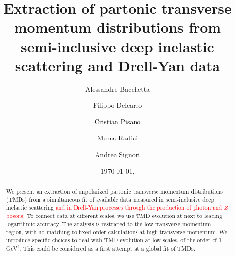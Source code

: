 \documentclass[aps,preprintnumbers,showpacs,nofootinbib,superscriptaddress,floatfix]{revtex4}
\begin{document}
\allowdisplaybreaks[2]


\title{
Extraction of partonic transverse momentum distributions 
from semi-inclusive deep
inelastic scattering and Drell-Yan data
}

\author{Alessandro Bacchetta}

\author{Filippo Delcarro}

\author{Cristian Pisano}

\author{Marco Radici}

\author{Andrea Signori}

\begin{abstract}
We present an extraction of unpolarized partonic transverse momentum distributions (TMDs)
from a simultaneous fit of available data measured in semi-inclusive deep inelastic scattering 
\textcolor{red}{and in Drell-Yan processes through the production of photon and $Z$ bosons}. 
To connect data at different scales, we use TMD evolution at next-to-leading logarithmic accuracy. The
analysis is restricted to the low-transverse-momentum region, with no matching
to fixed-order calculations at high transverse momentum. We introduce specific
choices to deal with TMD evolution at low scales, of the order of 1 GeV$^2$.
This could be considered as a first attempt at a global fit of TMDs.
\end{abstract}


\date{\today, \currenttime}
\end{document}
